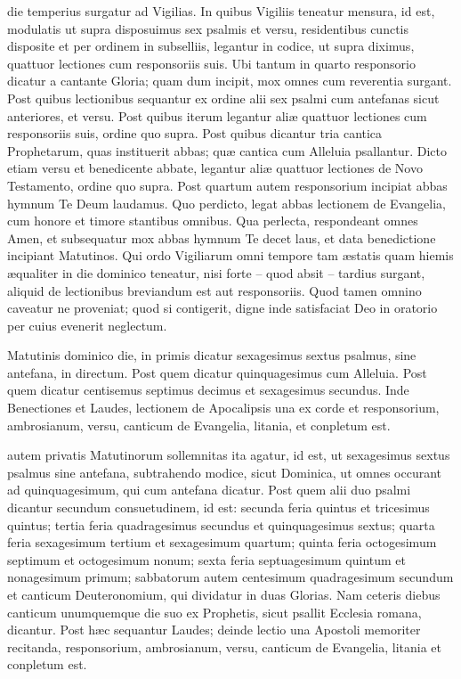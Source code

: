 \documentclass[fontsize=9pt,paper=A6,twoside,BCOR=1mm,DIV=22,headinclude]{scrarticle}
\begin{document}
\begin{multicols}{2}
 die temperius surgatur ad Vigilias. In quibus Vigiliis teneatur mensura, id est, modulatis ut supra disposuimus sex psalmis et versu, residentibus cunctis disposite et per ordinem in subselliis, legantur in codice, ut supra diximus, quattuor lectiones cum responsoriis suis. Ubi tantum in quarto responsorio dicatur a cantante Gloria; quam dum incipit, mox omnes cum reverentia surgant. Post quibus lectionibus sequantur ex ordine alii sex psalmi cum antefanas sicut anteriores, et versu. Post quibus iterum legantur aliæ quattuor lectiones cum responsoriis suis, ordine quo supra. Post quibus dicantur tria cantica Prophetarum, quas instituerit abbas; quæ cantica cum Alleluia psallantur. Dicto etiam versu et benedicente abbate, legantur aliæ quattuor lectiones de Novo Testamento, ordine quo supra. Post quartum autem responsorium incipiat abbas hymnum Te Deum laudamus. Quo perdicto, legat abbas lectionem de Evangelia, cum honore et timore stantibus omnibus. Qua perlecta, respondeant omnes Amen, et subsequatur mox abbas hymnum Te decet laus, et data benedictione incipiant Matutinos. Qui ordo Vigiliarum omni tempore tam æstatis quam hiemis æqualiter in die dominico teneatur, nisi forte – quod absit – tardius surgant, aliquid de lectionibus breviandum est aut responsoriis. Quod tamen omnino caveatur ne proveniat; quod si contigerit, digne inde satisfaciat Deo in oratorio per cuius evenerit neglectum. 

 Matutinis dominico die, in primis dicatur sexagesimus sextus psalmus, sine antefana, in directum. Post quem dicatur quinquagesimus cum Alleluia. Post quem dicatur centisemus septimus decimus et sexagesimus secundus. Inde Benectiones et Laudes, lectionem de Apocalipsis una ex corde et responsorium, ambrosianum, versu, canticum de Evangelia, litania, et conpletum est. 

{
 autem privatis Matutinorum sollemnitas ita agatur, id est, ut sexagesimus sextus psalmus sine antefana, subtrahendo modice, sicut Dominica, ut omnes occurant ad quinquagesimum, qui cum antefana dicatur. Post quem alii duo psalmi dicantur secundum consuetudinem, id est: secunda feria quintus et tricesimus quintus; tertia feria quadragesimus secundus et quinquagesimus sextus; quarta feria sexagesimum tertium et sexagesimum quartum; quinta feria octogesimum septimum et octogesimum nonum; sexta feria septuagesimum quintum et nonagesimum primum; sabbatorum autem centesimum quadragesimum secundum et canticum Deuteronomium, qui dividatur in duas Glorias. Nam ceteris diebus canticum unumquemque die suo ex Prophetis, sicut psallit Ecclesia romana, dicantur. Post hæc sequantur Laudes; deinde lectio una Apostoli memoriter recitanda, responsorium, ambrosianum, versu, canticum de Evangelia, litania et conpletum est.

}
\end{multicols}
\end{document}
